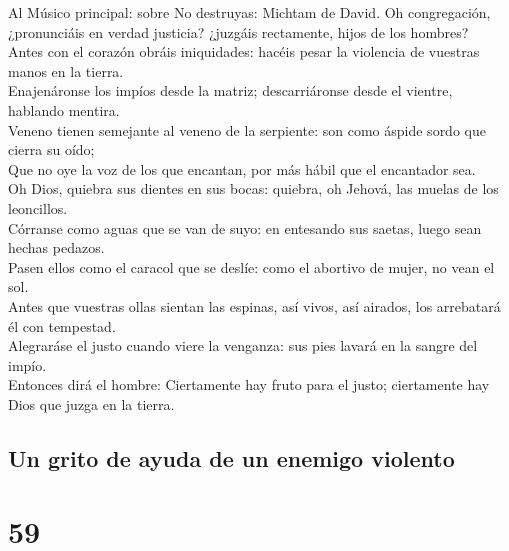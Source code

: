  Al Músico principal: sobre No destruyas: Michtam de
David. Oh congregación, ¿pronunciáis en verdad justicia? ¿juzgáis
rectamente, hijos de los hombres?\\
 Antes con el corazón obráis iniquidades: hacéis pesar la
violencia de vuestras manos en la tierra.\\
 Enajenáronse los impíos desde la matriz; descarriáronse
desde el vientre, hablando mentira.\\
 Veneno tienen semejante al veneno de la serpiente: son
como áspide sordo que cierra su oído;\\
 Que no oye la voz de los que encantan, por más hábil que
el encantador sea.\\
 Oh Dios, quiebra sus dientes en sus bocas: quiebra, oh
Jehová, las muelas de los leoncillos.\\
 Córranse como aguas que se van de suyo: en entesando sus
saetas, luego sean hechas pedazos.\\
 Pasen ellos como el caracol que se deslíe: como el
abortivo de mujer, no vean el sol.\\
 Antes que vuestras ollas sientan las espinas, así vivos,
así airados, los arrebatará él con tempestad.\\
 Alegraráse el justo cuando viere la venganza: sus pies
lavará en la sangre del impío.\\
 Entonces dirá el hombre: Ciertamente hay fruto para el
justo; ciertamente hay Dios que juzga en la tierra.

\hypertarget{un-grito-de-ayuda-de-un-enemigo-violento}{%
\subsection{Un grito de ayuda de un enemigo
violento}\label{un-grito-de-ayuda-de-un-enemigo-violento}}

\hypertarget{section-58}{%
\section{59}\label{section-58}}

